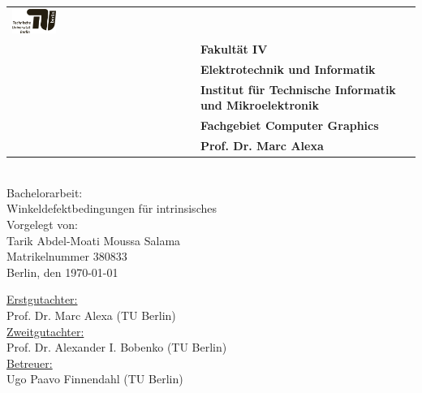 \begin{titlepage}
	\sffamily
    \raggedleft
	\small
	\begin{center}		
		\color{gray}
		\begin{tabularx}{\textwidth}{R{0.5\textwidth}L{0.5\textwidth}}
			\includegraphics[width=0.25\textwidth]{images/Logo_TU.pdf}&\\
			&\textbf{Fakultät IV}\\
			&\textbf{Elektrotechnik und Informatik}\\
			&\textbf{Institut für Technische Informatik und Mikroelektronik}\\
			&\textbf{Fachgebiet Computer Graphics}\\
			&\textbf{Prof. Dr. Marc Alexa}\\
		\end{tabularx}	
	\end{center}
	\mbox{}\vspace{2\baselineskip}\\
	\sffamily\huge
	\centering   
	Bachelorarbeit:\vspace{0.25\baselineskip}\\
	\sffamily\Huge
Winkeldefektbedingungen für intrinsisches \delaunayRefinement \vspace{1.5\baselineskip}\\
	\sffamily\normalsize
	Vorgelegt von:\vspace{0.5\baselineskip}\\	
	Tarik Abdel-Moati Moussa Salama\vspace{0.25\baselineskip}\\
	Matrikelnummer 380833\vspace{0.25\baselineskip}\\
	
	\sffamily\large
	Berlin, den \today
	\vspace{3\baselineskip}\\

   \vfill
   \raggedright
   \small 
   \centering
	\vfill	
	\uline{Erstgutachter:}\vspace{0.25\baselineskip}\\
	Prof. Dr. Marc Alexa (TU Berlin)\vspace{0.5\baselineskip}\\
	\uline{Zweitgutachter:}\vspace{0.25\baselineskip}\\
	Prof. Dr. Alexander I. Bobenko (TU Berlin)
	\vspace{2\baselineskip}\\
	\uline{Betreuer:}\vspace{0.25\baselineskip}\\
	Ugo Paavo Finnendahl (TU Berlin)\vspace{0.25\baselineskip}\\

\end{titlepage}
